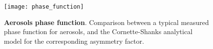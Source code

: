 \begin{figure}
\begin{center}
\texttt{[image: phase\_function]}
\end{center}
\caption{{\bf Aerosols phase function}. Comparison between a typical measured
phase function for aerosols, and the Cornette-Shanks analytical model for the
corresponding asymmetry factor.}\label{fig:phasefunction}
\end{figure}

